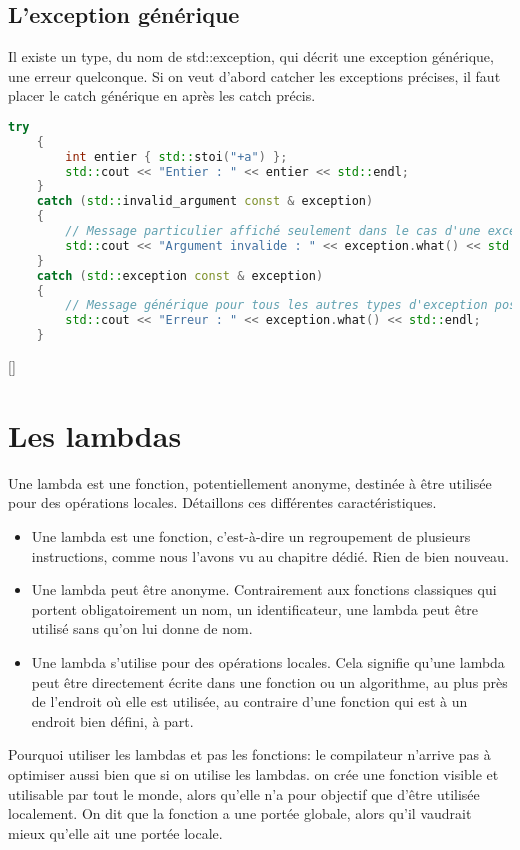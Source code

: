 \documentclass{article}
\begin{document}
\begin{itemize}
\subsection{L'exception générique}
Il existe un type, du nom de std::exception, qui décrit une exception générique, une erreur quelconque. Si on veut d'abord catcher les exceptions précises, il faut placer le catch générique en après les catch précis.

\begin{lstlisting}[language=C++]
    try
    {
        int entier { std::stoi("+a") };
        std::cout << "Entier : " << entier << std::endl;
    }
    catch (std::invalid_argument const & exception)
    {
        // Message particulier affiché seulement dans le cas d'une exception std::invalid_argument.
        std::cout << "Argument invalide : " << exception.what() << std::endl;
    }
    catch (std::exception const & exception)
    {
        // Message générique pour tous les autres types d'exception possibles.
        std::cout << "Erreur : " << exception.what() << std::endl;
    }
\end{lstlisting}[]

\section{Les lambdas}
Une lambda est une fonction, potentiellement anonyme, destinée à être utilisée pour des opérations locales. Détaillons ces différentes caractéristiques.
\begin{itemize}
    \item Une lambda est une fonction, c’est-à-dire un regroupement de plusieurs instructions, comme nous l’avons vu au chapitre dédié. Rien de bien nouveau.
    \item Une lambda peut être anonyme. Contrairement aux fonctions classiques qui portent obligatoirement un nom, un identificateur, une lambda peut être utilisé sans qu’on lui donne de nom.
    \item Une lambda s’utilise pour des opérations locales. Cela signifie qu’une lambda peut être directement écrite dans une fonction ou un algorithme, au plus près de l’endroit où elle est utilisée, au contraire d’une fonction qui est à un endroit bien défini, à part.
\end{itemize}{}

Pourquoi utiliser les lambdas et pas les fonctions: le compilateur n’arrive pas à optimiser aussi bien que si on utilise les lambdas. on crée une fonction visible et utilisable par tout le monde, alors qu’elle n’a pour objectif que d’être utilisée localement. On dit que la fonction a une portée globale, alors qu’il vaudrait mieux qu’elle ait une portée locale.


\end{itemize}
\end{document}
